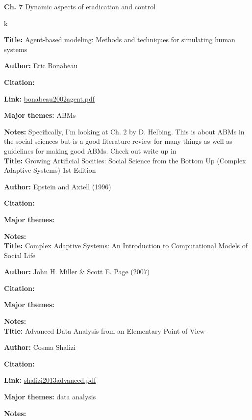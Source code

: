 \message{ !name(refs.tex)}\documentclass{article}
\begin{document}
\textbf{Ch. 7} Dynamic aspects of eradication and control

k \textbf{}


\textbf{Title:}  Agent-based modeling: Methods and techniques for simulating human systems

\textbf{Author:}  Eric Bonabeau

\textbf{Citation:}\cite{bonabeau2002agent}

\textbf{Link:} \url{bonabeau2002agent.pdf}

\textbf{Major themes:}  ABMs 

\textbf{Notes:}  Specifically, I'm looking at Ch. 2 by D. Helbing.  This is about ABMs in the social sciences but is a good literature review for many things as well as guidelines for making good ABMs.  Check out write up in 
\\

\textbf{Title:} Growing Artificial Socities:  Social Science from the Bottom Up (Complex Adaptive Systems) 1st Edition

\textbf{Author:}  Epstein and Axtell (1996)

\textbf{Citation:}

\textbf{Major themes:}  

\textbf{Notes:}
\\

\textbf{Title:}  Complex Adaptive Systems:  An Introduction to Computational Models of Social Life 

\textbf{Author:}  John H. Miller \& Scott E. Page (2007)

\textbf{Citation:} \cite{Grimm11112005}

\textbf{Major themes:}  

\textbf{Notes:}
\\

\textbf{Title:} Advanced Data Analysis from an Elementary Point of View

\textbf{Author:}  Cosma Shalizi

\textbf{Citation:} \cite{shalizi2013advanced}

\textbf{Link:} \url{shalizi2013advanced.pdf}

\textbf{Major themes:}  data analysis

\textbf{Notes:}
\\
\end{document}
